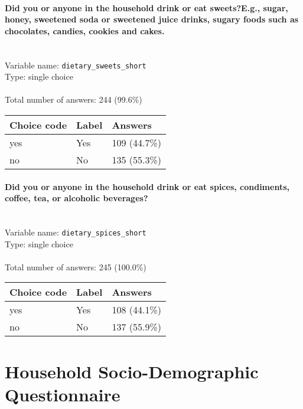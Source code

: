 \documentclass[11.5pt, a4paper]{scrartcl}
\begin{document}
\paragraph{Did you or anyone in the household drink or eat sweets?E.g., sugar, honey, sweetened soda or sweetened juice drinks, sugary foods such as chocolates, candies, cookies and cakes.}
\  \\Variable name: \texttt{dietary\_sweets\_short}\\
Type: single choice\\
\\Total number of answers: 244 (99.6\%)
\\[0.2em] \begin{tabular}{p{4cm}|p{8cm}|p{3cm}}
Choice code & Label & Answers \\
\hline
yes & Yes& \cellcolor{color2}109 (44.7\%)\\
\cellcolor{mygray} no & \cellcolor{mygray}No & \cellcolor{color2}135 (55.3\%)\\
\end{tabular}
\paragraph{Did you or anyone in the household drink or eat spices, condiments, coffee, tea, or alcoholic beverages?}
\  \\Variable name: \texttt{dietary\_spices\_short}\\
Type: single choice\\
\\Total number of answers: 245 (100.0\%)
\\[0.2em] \begin{tabular}{p{4cm}|p{8cm}|p{3cm}}
Choice code & Label & Answers \\
\hline
yes & Yes& \cellcolor{color2}108 (44.1\%)\\
\cellcolor{mygray} no & \cellcolor{mygray}No & \cellcolor{color2}137 (55.9\%)\\
\end{tabular}
\newpage\section{Household Socio-Demographic Questionnaire}
\end{document}
